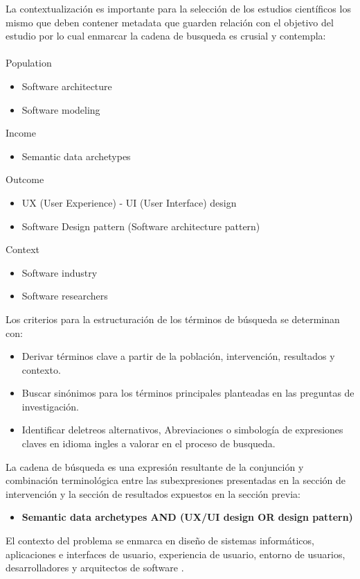 \documentclass[12pt,a4paper]{article}
\begin{document}
La contextualización es importante para la selección de los estudios científicos los mismo que deben contener metadata que guarden relación con el objetivo del estudio por lo cual enmarcar la cadena de busqueda es crusial y contempla:
\\\\
Population 
\begin{itemize}
  \item Software architecture 
  \item Software modeling 
\end{itemize}
Income
\begin{itemize}
  \item Semantic data archetypes
\end{itemize}
Outcome 
\begin{itemize}
  \item UX (User Experience) - UI (User Interface) design 
  \item Software Design pattern (Software architecture pattern)
\end{itemize}
Context 
\begin{itemize}
  \item Software industry
  \item Software researchers 
\end{itemize}

Los criterios para la estructuración de los términos de búsqueda se determinan con:
\begin{itemize}
  \item
   Derivar términos clave a partir de la población, intervención, resultados y contexto.
  \item
   Buscar sinónimos para los términos principales planteadas en las preguntas de investigación.
  \item
   Identificar deletreos alternativos, Abreviaciones o simbología de expresiones claves en idioma ingles a valorar en el proceso de busqueda.
\end{itemize}

La cadena de búsqueda es una expresión resultante de la conjunción y combinación terminológica entre las subexpresiones presentadas en la sección de intervención y la sección de resultados expuestos en la sección previa:
\begin{itemize}
  \item  \textbf{  Semantic data archetypes AND (UX/UI design OR design pattern) }
\end{itemize}

El contexto del problema se enmarca en diseño de sistemas informáticos, aplicaciones e interfaces de usuario, experiencia de usuario, entorno de usuarios, desarrolladores y arquitectos de software \cite{Inga2023}.
\end{document}
